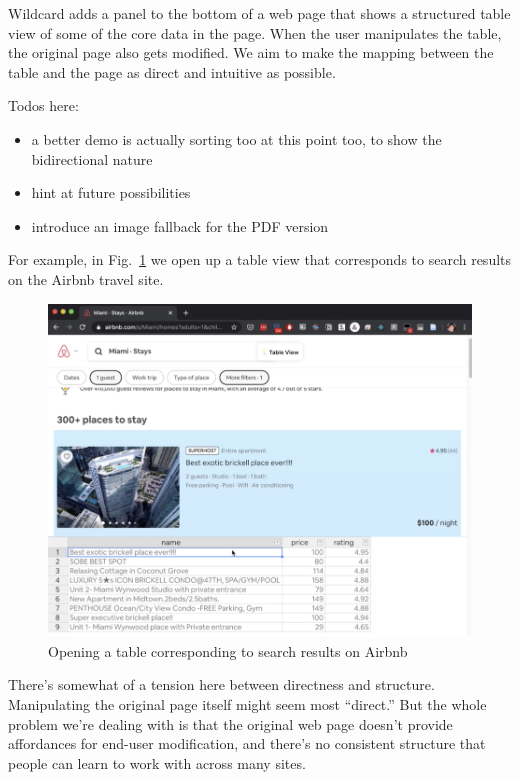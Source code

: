 \documentclass[english,submission]{programming}
\providecommand{\tightlist}{%
  \setlength{\itemsep}{0pt}\setlength{\parskip}{0pt}}
\begin{document}
Wildcard adds a panel to the bottom of a web page that shows a
structured table view of some of the core data in the page. When the
user manipulates the table, the original page also gets modified. We aim
to make the mapping between the table and the page as direct and
intuitive as possible.

Todos here:

\begin{itemize}
\tightlist
\item
  a better demo is actually sorting too at this point too, to show the
  bidirectional nature
\item
  hint at future possibilities
\item
  introduce an image fallback for the PDF version
\end{itemize}

For example, in Fig.~\ref{fig:table} we open up a table view that
corresponds to search results on the Airbnb travel site.

\begin{figure}
\hypertarget{fig:table}{%
\centering
\includegraphics{media/opentable.png}
\caption{Opening a table corresponding to search results on
Airbnb}\label{fig:table}
}
\end{figure}

There's somewhat of a tension here between directness and structure.
Manipulating the original page itself might seem most ``direct.'' But
the whole problem we're dealing with is that the original web page
doesn't provide affordances for end-user modification, and there's no
consistent structure that people can learn to work with across many
sites.
\end{document}
